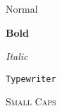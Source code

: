 \documentclass[varwidth]{standalone}
\begin{document}
Normal

\textbf{Bold}

\textit{Italic}

\texttt{Typewriter}

\textsc{Small Caps}
\end{document}
